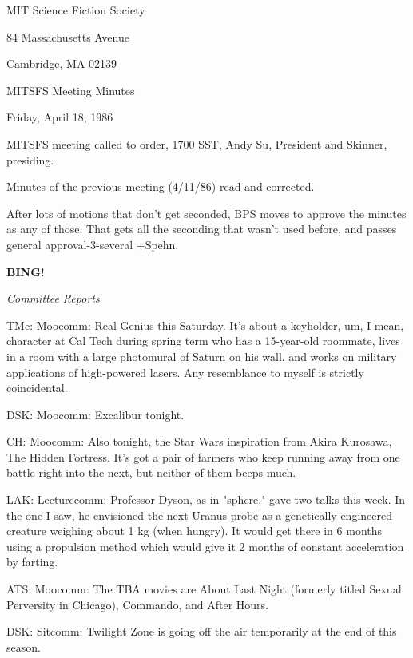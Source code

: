 \documentclass[12pt]{article}
\newcommand{\bing}{{\bf BING!} }
\newcommand{\goto}[1]{\bing \vskip 12pt \centerline{{\em{#1}}}}
\begin{document}
\begin{center}

MIT Science Fiction Society 

84 Massachusetts Avenue

Cambridge, MA 02139

\vspace{12pt}

MITSFS Meeting Minutes 

Friday, April 18, 1986

\end{center}
 
\vspace{18pt}

\setlength{\parskip}{6pt}

\noindent
MITSFS meeting called to order, 1700 SST,
Andy Su, President and Skinner, presiding.

Minutes of the previous meeting (4/11/86) read and corrected.

After lots of motions that don't get seconded, BPS moves to approve the minutes as any of those. That gets all the seconding that wasn't used before, and passes general approval-3-several +Spehn.

\goto{Committee Reports}

TMc: Moocomm: Real Genius this Saturday. It's about a keyholder, um, I mean, character at Cal Tech during spring term who has a 15-year-old roommate, lives in a room with a large photomural of Saturn on his wall, and works on military applications of high-powered lasers. Any resemblance to myself is strictly coincidental.

DSK: Moocomm: Excalibur tonight.

CH: Moocomm: Also tonight, the Star Wars inspiration from Akira Kurosawa, The Hidden Fortress. It's got a pair of farmers who keep running away from one battle right into the next, but neither of them beeps much.

LAK: Lecturecomm: Professor Dyson, as in "sphere," gave two talks this week. In the one I saw, he envisioned the next Uranus probe as a genetically engineered creature weighing about 1 kg (when hungry). It would get there in 6 months using a propulsion method which would give it 2 months of constant acceleration by farting.

ATS: Moocomm: The TBA movies are About Last Night (formerly titled Sexual Perversity in Chicago), Commando, and After Hours.

DSK: Sitcomm: Twilight Zone is going off the air temporarily at the end of this season.
\end{document}
